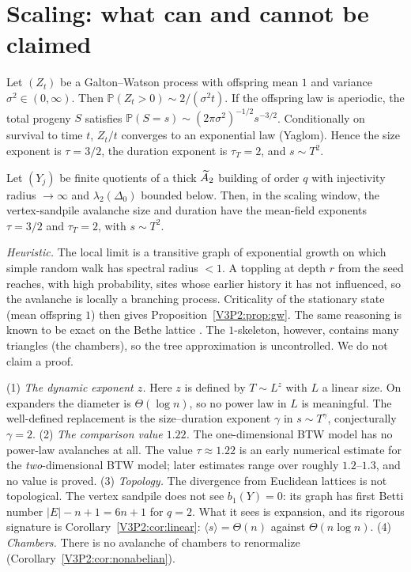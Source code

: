 \section{Scaling: what can and cannot be claimed}\label{V3P2:sec:scaling}

\begin{proposition}\label{V3P2:prop:gw}
Let $(Z_t)$ be a Galton--Watson process with offspring mean $1$ and variance
$\sigma^{2}\in(0,\infty)$. Then $\mathbb P(Z_t>0)\sim2/(\sigma^{2}t)$. If the offspring law
is aperiodic, the total progeny $S$ satisfies
$\mathbb P(S=s)\sim(2\pi\sigma^{2})^{-1/2}s^{-3/2}$. Conditionally on survival to time $t$,
$Z_t/t$ converges to an exponential law (Yaglom). Hence the size exponent is $\tau=3/2$, the
duration exponent is $\tau_T=2$, and $s\sim T^{2}$.
\end{proposition}

\begin{conjecture}\label{V3P2:conj:mf}
Let $(Y_j)$ be finite quotients of a thick $\widetilde A_2$ building of order $q$ with injectivity
radius $\to\infty$ and $\lambda_2(\Delta_0)$ bounded below. Then, in the scaling window, the
vertex-sandpile avalanche size and duration have the mean-field exponents $\tau=3/2$ and
$\tau_T=2$, with $s\sim T^{2}$.
\end{conjecture}

\emph{Heuristic.} The local limit is a transitive graph of exponential growth on which
simple random walk has spectral radius $<1$. A toppling at depth $r$ from the seed reaches,
with high probability, sites whose earlier history it has not influenced, so the avalanche
is locally a branching process. Criticality of the stationary state (mean offspring $1$)
then gives Proposition~\ref{V3P2:prop:gw}. The same reasoning is known to be exact on the
Bethe lattice \cite{DM90}. The $1$-skeleton, however, contains many triangles (the chambers),
so the tree approximation is uncontrolled. We do not claim a proof.

\begin{remark}\label{V3P2:rem:exponents}
(1) \emph{The dynamic exponent $z$.} Here $z$ is defined by $T\sim L^{z}$ with $L$ a linear
size. On expanders the diameter is $\Theta(\log n)$, so no power law in $L$ is meaningful.
The well-defined replacement is the size--duration exponent $\gamma$ in $s\sim T^{\gamma}$,
conjecturally $\gamma=2$. (2) \emph{The comparison value $1.22$.} The one-dimensional BTW
model has no power-law avalanches at all. The value $\tau\approx1.22$ is an early numerical
estimate for the \emph{two}-dimensional BTW model; later estimates range over roughly
$1.2$--$1.3$, and no value is proved. (3) \emph{Topology.} The divergence from Euclidean
lattices is not topological. The vertex sandpile does not see $b_1(Y)=0$: its graph has
first Betti number $|E|-n+1=6n+1$ for $q=2$. What it sees is expansion, and its rigorous
signature is Corollary~\ref{V3P2:cor:linear}: $\langle s\rangle=\Theta(n)$ against
$\Theta(n\log n)$. (4) \emph{Chambers.} There is no avalanche of chambers to renormalize
(Corollary~\ref{V3P2:cor:nonabelian}).
\end{remark}

